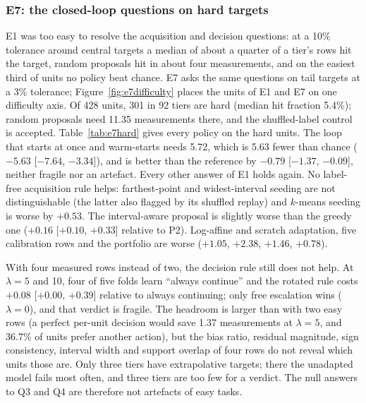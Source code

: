 \documentclass[11pt,a4paper]{article}
\begin{document}
\subsubsection{E7: the closed-loop questions on hard targets}
\label{sec:e7}
E1 was too easy to resolve the acquisition and decision questions: at a 10\% tolerance around central
targets a median of about a quarter of a tier's rows hit the target, random proposals hit in about four
measurements, and on the easiest third of units no policy beat chance. E7 asks the same questions on
tail targets at a 3\% tolerance; Figure~\ref{fig:e7difficulty} places the units of E1 and E7 on one difficulty axis. Of 428 units, 301 in 92 tiers are hard (median hit fraction
5.4\%); random proposals need 11.35 measurements there, and the shuffled-label control is
accepted. Table~\ref{tab:e7hard} gives every policy on the hard units. The loop that starts at once and
warm-starts needs 5.72, which is 5.63 fewer than chance ($-5.63$ [$-7.64$, $-3.34$]), and is better than
the reference by $-0.79$ [$-1.37$, $-0.09$], neither fragile nor an artefact. Every other answer of E1
holds again. No label-free acquisition rule helps: farthest-point and widest-interval seeding are not
distinguishable (the latter also flagged by its shuffled replay) and $k$-means seeding is worse by
$+0.53$. The interval-aware proposal is slightly worse than the greedy one ($+0.16$
[$+0.10$, $+0.33$] relative to P2). Log-affine and scratch adaptation, five calibration rows and the portfolio
are worse ($+1.05$, $+2.38$, $+1.46$, $+0.78$).

With four measured rows instead of two, the decision rule still does not help. At $\lambda = 5$ and
10, four of five folds learn ``always continue'' and the rotated rule costs $+0.08$
[$+0.00$, $+0.39$] relative to always continuing; only free escalation wins ($\lambda = 0$), and that
verdict is fragile. The headroom is larger than with two easy rows (a perfect per-unit decision would
save 1.37 measurements at $\lambda = 5$, and 36.7\% of units prefer another action), but the bias
ratio, residual magnitude, sign consistency, interval width and support overlap of four rows do not
reveal which units those are. Only three tiers have extrapolative targets; there the unadapted model
fails most often, and three tiers are too few for a verdict. The null answers to Q3 and Q4
are therefore not artefacts of easy tasks.
\end{document}
